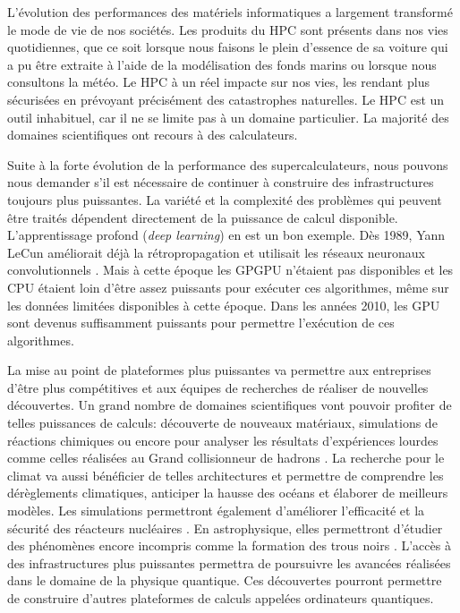             
        L'évolution des performances des matériels informatiques a largement transformé le mode de vie de nos sociétés. Les produits du HPC sont présents dans nos vies quotidiennes, que ce soit lorsque nous faisons le plein d'essence de sa voiture qui a pu être extraite à l'aide de la modélisation des fonds marins ou lorsque nous consultons la météo. Le HPC à un réel impacte sur nos vies, les rendant plus sécurisées en prévoyant précisément des catastrophes naturelles. 
        Le HPC est un outil inhabituel, car il ne se limite pas à un domaine particulier. La majorité des domaines scientifiques ont recours à des calculateurs. 
  
        Suite à la forte évolution de la performance des supercalculateurs, nous pouvons nous demander s'il est nécessaire de continuer à construire des infrastructures toujours plus puissantes. La variété et la complexité des problèmes qui peuvent être traités dépendent directement de la puissance de calcul disponible. L’apprentissage profond (\textit{deep learning}) en est un bon exemple. Dès 1989, Yann LeCun améliorait déjà la rétropropagation \cite{Treibig2012a} et utilisait les réseaux neuronaux convolutionnels \cite{LeCun1989}. Mais à cette époque les GPGPU n'étaient pas disponibles et les CPU étaient loin d'être assez puissants pour exécuter ces algorithmes, même sur les données limitées disponibles à cette époque. Dans les années 2010, les GPU sont devenus suffisamment puissants pour permettre l'exécution de ces algorithmes.
        
        
        La mise au point de plateformes plus puissantes va permettre aux entreprises d'être plus compétitives et aux équipes de recherches de réaliser de nouvelles découvertes. Un grand nombre de domaines scientifiques vont pouvoir profiter de telles puissances de calculs: découverte de nouveaux matériaux, simulations de réactions chimiques ou encore pour analyser les résultats d'expériences lourdes comme celles réalisées au Grand collisionneur de hadrons \cite{10.1007/978-3-319-67630-2_52}. La recherche pour le climat va aussi bénéficier de telles architectures et permettre de comprendre les dérèglements climatiques, anticiper la hausse des océans et élaborer de meilleurs modèles. Les simulations permettront également d'améliorer l'efficacité et la sécurité des réacteurs nucléaires \cite{Simon2007}. En astrophysique, elles permettront d'étudier des phénomènes encore incompris comme la formation des trous noirs \cite{10.1007/978-3-642-38750-0_2}. L'accès à des infrastructures plus puissantes permettra de poursuivre les avancées réalisées dans le domaine de la physique quantique. Ces découvertes pourront permettre de construire d'autres plateformes de calculs appelées ordinateurs quantiques.
        
